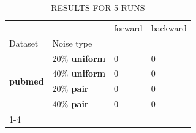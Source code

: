 \begin{table}
\caption{RESULTS FOR 5 RUNS}
\begin{tabular}{llll}
\toprule
 &  & forward & backward \\
Dataset & Noise type &  &  \\
\midrule
\multirow[t]{4}{*}{\textbf{pubmed}} & \textbf{$ 20 \% $ uniform} & 0 & 0 \\
\textbf{} & \textbf{$ 40 \% $ uniform} & 0 & 0 \\
\textbf{} & \textbf{$ 20 \% $ pair} & 0 & 0 \\
\textbf{} & \textbf{$ 40 \% $ pair} & 0 & 0 \\
\cline{1-4}
\bottomrule
\end{tabular}
\end{table}
